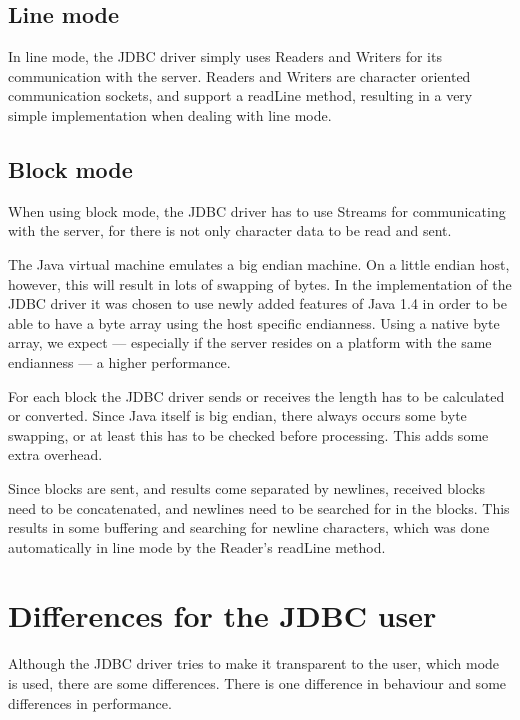 \documentclass{article}
\begin{document}
\subsection{Line mode}

In line mode, the JDBC driver simply uses \textsf{Reader}s and
\textsf{Writer}s for its communication with the server. \textsf{Reader}s
and \textsf{Writer}s are character oriented communication sockets,
and support a \textsf{readLine} method, resulting in a very
simple implementation when dealing with line mode.


\subsection{Block mode}

When using block mode, the JDBC driver has to use \textsf{Stream}s
for communicating with the server, for there is not only character data
to be read and sent.

The Java virtual machine emulates a big endian machine. On a little
endian host, however, this will result in lots of swapping of bytes.
In the implementation of the JDBC driver it was chosen to use newly
added features of Java 1.4 in order to be able to have a byte array
using the host specific endianness. Using a native byte array, we
expect --- especially if the server resides on a platform with the same
endianness --- a higher performance.

For each block the JDBC driver sends or receives the length has
to be calculated or converted. Since Java itself is big endian, there
always occurs some byte swapping, or at least this has to be checked
before processing. This adds some extra overhead.

Since blocks are sent, and results come separated by newlines,
received blocks need to be concatenated, and newlines need to be
searched for in the blocks. This results in some buffering and
searching for newline characters, which was done automatically
in line mode by the \textsf{Reader}'s \textsf{readLine} method.


\section{Differences for the JDBC user}

Although the JDBC driver tries to make it transparent to the user, which
mode is used, there are some differences. There is one difference in
behaviour and some differences in performance.
\end{document}
